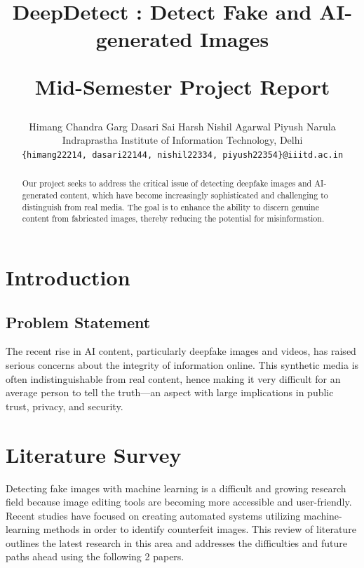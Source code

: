 \documentclass[10pt,twocolumn,letterpaper]{article}
\begin{document}
\title{\begin{center}
    \vspace{-1.75cm}
    DeepDetect : Detect Fake and AI-generated Images
\end{center}
Mid-Semester Project Report}

\author{Himang Chandra Garg \qquad Dasari Sai Harsh \qquad Nishil Agarwal \qquad Piyush Narula\\
Indraprastha Institute of Information Technology, Delhi\\
{\tt\small \{himang22214, dasari22144, nishil22334, piyush22354\}@iiitd.ac.in}
}

\maketitle

\pagestyle{empty}


\begin{abstract}

Our project seeks to address the critical issue of detecting deepfake images and AI-generated content, which have become increasingly sophisticated and challenging to distinguish from real media. 
The goal is to enhance the ability to discern genuine content from fabricated images, thereby reducing the potential for misinformation.

\end{abstract}

\vspace{-5pt}
\section{Introduction}
\subsection{Problem Statement}

The recent rise in AI content, particularly deepfake images and videos, has raised serious concerns about the integrity of information online. 
This synthetic media is often indistinguishable from real content, hence making it very difficult for an average person to tell the truth—an aspect with large implications in public trust, privacy, and security.

\section{Literature Survey}
Detecting fake images with machine learning is a difficult and growing research field because image editing tools are becoming more accessible and user-friendly. Recent studies have focused on creating automated systems utilizing machine-learning methods in order to identify counterfeit images. This review of literature outlines the latest research in this area and addresses the difficulties and future paths ahead using the following 2 papers.
\end{document}
